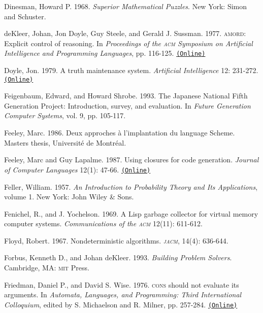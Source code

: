 \documentclass[oneside]{book}
\newcommand{\acronym}[1]{\textsc{\MakeLowercase{#1}}}
\newcommand{\code}[1]{\texttt{#1}}
\begin{document}
 \label{Dinesman 1968}
Dinesman, Howard P.  1968.  \textit{Superior Mathematical Puzzles}.  New York:
Simon and Schuster.

 \label{deKleer et al. 1977}
deKleer, Johan, Jon Doyle, Guy Steele, and Gerald J. Sussman.  1977.
\acronym{AMORD}: Explicit control of reasoning.  In \textit{Proceedings of the
\acronym{ACM} Symposium on Artificial Intelligence and Programming Languages},
pp.  116-125.
\href{http://dspace.mit.edu/handle/1721.1/5750}{\code{(Online)}}

 \label{Doyle (1979)}
Doyle, Jon. 1979. A truth maintenance system. \textit{Artificial Intelligence}
12: 231-272.
\href{http://dspace.mit.edu/handle/1721.1/5733}{\code{(Online)}}

 \label{Feigenbaum and Shrobe 1993}
Feigenbaum, Edward, and Howard Shrobe. 1993. The Japanese National Fifth
Generation Project: Introduction, survey, and evaluation.  In \textit{Future
Generation Computer Systems}, vol. 9, pp. 105-117.

 \label{Feeley (1986)}
Feeley, Marc.  1986.  Deux approches \`a l'implantation du language
Scheme.  Masters thesis, Universit\'e de Montr\'eal.

 \label{Feeley and Lapalme 1987}
Feeley, Marc and Guy Lapalme.  1987.  Using closures for code generation.
\textit{Journal of Computer Languages} 12(1): 47-66.
\href{http://citeseerx.ist.psu.edu/viewdoc/summary?doi=10.1.1.90.6978}{\code{(Online)}}

Feller, William.  1957.  \textit{An Introduction to Probability Theory and Its
Applications}, volume 1. New York: John Wiley \& Sons.

 \label{Fenichel and Yochelson (1969)}
Fenichel, R., and J. Yochelson.  1969.  A Lisp garbage collector for virtual
memory computer systems.  \textit{Communications of the \acronym{ACM}}
12(11): 611-612.

 \label{Floyd (1967)}
Floyd, Robert. 1967. Nondeterministic algorithms. \textit{\acronym{JACM}},
14(4): 636-644.

 \label{Forbus and deKleer 1993}
Forbus, Kenneth D., and Johan deKleer.  1993. \textit{Building Problem
Solvers}. Cambridge, MA: \acronym{MIT} Press.

 \label{Friedman and Wise (1976)}
Friedman, Daniel P., and David S. Wise.  1976.  \acronym{CONS} should not
evaluate its arguments. In \textit{Automata, Languages, and Programming: Third
International Colloquium}, edited by S. Michaelson and R.  Milner, pp. 257-284.
\href{https://www.cs.indiana.edu/cgi-bin/techreports/TRNNN.cgi?trnum=TR44}{\code{(Online)}}
\end{document}
